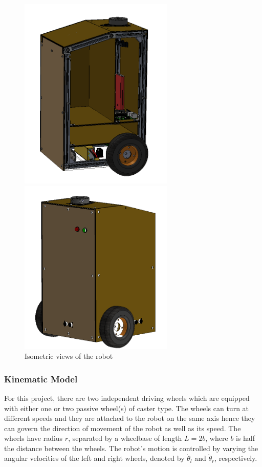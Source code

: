 \begin{figure}[H]
    \centering
    \begin{minipage}{0.45\textwidth}
        \centering
        \includegraphics[width=2.9in]{pics/front_cart.png}
    \end{minipage}\hfill
    \begin{minipage}{0.45\textwidth}
        \centering
        \includegraphics[width=2.9in]{pics/back_cart.png}
    \end{minipage}\hfill
    \caption{Isometric views of the robot}\label{back_cart}
\end{figure}

\vspace{-1.2em}

\subsubsection{Kinematic Model}
For this project, there are two independent driving wheels which are equipped with either one or two passive wheel(s) of caster type. The wheels
can turn at different speeds and they are attached to the robot on the same axis hence they can govern the direction of movement of the robot
as well as its speed. The wheels have radius $r$, separated by a wheelbase of length $L = 2b$, where $b$ is half the distance between the wheels. The robot's motion is controlled by varying the angular velocities of the left and right wheels, denoted by $\dot{\theta}_l$ and $\dot{\theta}_r$, respectively.

